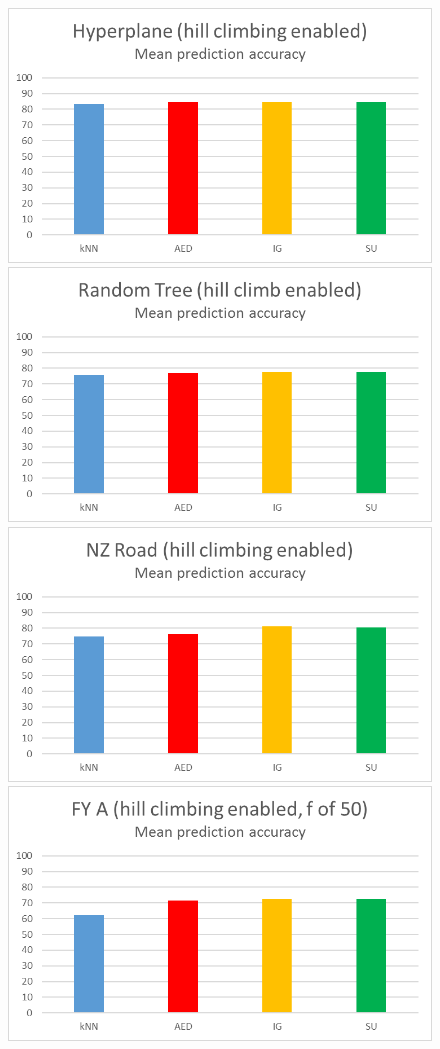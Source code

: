 \begin{figure}[hp]
\includegraphics[scale=0.17]{Graphs/Hyperplane/H_bar}
\includegraphics[scale=0.17]{Graphs/TreeD10/H_bar}
\includegraphics[scale=0.17]{Graphs/NZRoad/H_bar}
\includegraphics[scale=0.17]{Graphs/FY_A/H_bar}

\end{figure}
